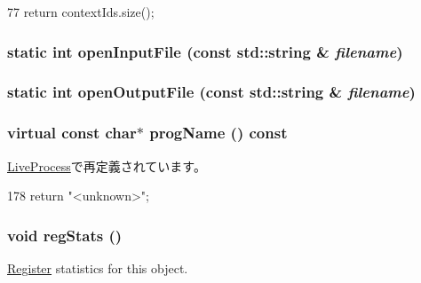 \begin{DoxyCode}
77 { return contextIds.size(); }
\end{DoxyCode}
\hypertarget{classProcess_acea5ecbb223871b0d852b03b68837461}{
\subsubsection[{openInputFile}]{\setlength{\rightskip}{0pt plus 5cm}static int openInputFile (const std::string \& {\em filename})}}
\label{classProcess_acea5ecbb223871b0d852b03b68837461}
\hypertarget{classProcess_a230c9c6213b49eef2273fa99e3a511ba}{
\subsubsection[{openOutputFile}]{\setlength{\rightskip}{0pt plus 5cm}static int openOutputFile (const std::string \& {\em filename})}}
\label{classProcess_a230c9c6213b49eef2273fa99e3a511ba}
\hypertarget{classProcess_a580745d5543eb666c37e2a5f37fb32a0}{
\subsubsection[{progName}]{\setlength{\rightskip}{0pt plus 5cm}virtual const char$\ast$ progName () const}}
\label{classProcess_a580745d5543eb666c37e2a5f37fb32a0}


\hyperlink{classLiveProcess_a580745d5543eb666c37e2a5f37fb32a0}{LiveProcess}で再定義されています。


\begin{DoxyCode}
178 { return "<unknown>"; }
\end{DoxyCode}
\hypertarget{classProcess_a4dc637449366fcdfc4e764cdf12d9b11}{
\subsubsection[{regStats}]{\setlength{\rightskip}{0pt plus 5cm}void regStats ()}}
\label{classProcess_a4dc637449366fcdfc4e764cdf12d9b11}
\hyperlink{classRegister}{Register} statistics for this object. 

